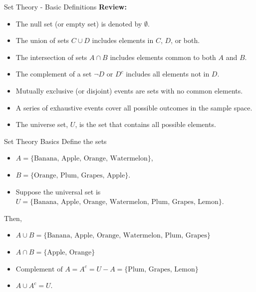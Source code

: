 \documentclass[handout]{beamer} %
\begin{document}
\begin{frame}{Set Theory - Basic Definitions}
    \textbf{Review:}
    \begin{itemize}
        \item The null set (or empty set) is denoted by \(\emptyset\).\pause
        \item The union of sets \(C \cup D\) includes elements in \(C\), \(D\), or both.\pause
        \item The intersection of sets \(A \cap B\) includes elements common to both \(A\) and \(B\).\pause
        \item The complement of a set $\neg D$ or \(D^c\) includes all elements not in \(D\).\pause
        \item Mutually exclusive (or disjoint) events are sets with no common elements.\pause
        \item A series of exhaustive events cover all possible outcomes in the sample space.\pause
        \item The universe set, $U$, is the set that contains all possible elements.
    \end{itemize}
\end{frame}


\begin{frame}{Set Theory Basics}
    Define the sets
    \begin{itemize}
        \item $A = \{\text{Banana, Apple, Orange, Watermelon}\}$, \pause
        \item $B = \{\text{Orange, Plum, Grapes, Apple}\}$. \pause
        \item Suppose the universal set is $U = \{\text{Banana, Apple, Orange, Watermelon, Plum, Grapes, Lemon}\}$.\pause
    \end{itemize}
    Then,\pause
    \begin{itemize}
        \item $A \cup B = \{\text{Banana, Apple, Orange, Watermelon, Plum, Grapes}\}$\pause
        \item $A \cap B = \{\text{Apple, Orange}\}$\pause
        \item $\text{Complement of } A = A^c = U - A = \{\text{Plum, Grapes, Lemon}\}$
        \item $A \cup A^c = U$.
    \end{itemize}
\end{frame}

\end{document}
